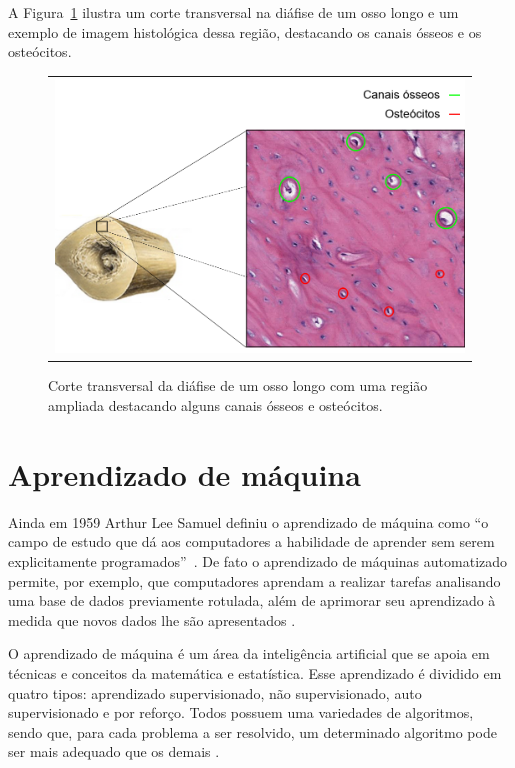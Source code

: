 A Figura~\ref{fig:corte-canais-osteocitos} ilustra um corte transversal na diáfise de um osso longo e um exemplo de imagem histológica dessa região, destacando os canais ósseos e os osteócitos.
\begin{figure}[H]
    \centering
    \center
    \begin{tabular}{@{}c@{}}
        \includegraphics[width=.8\linewidth]{figures/2_theoric_foundamentations/Corte-canais-osteocitos.png}
        \\[\abovecaptionskip]
    \end{tabular}
  
    \caption[Corte transversal da diáfise de um osso longo]{Corte transversal da diáfise de um osso longo com uma região ampliada destacando alguns canais ósseos e osteócitos.}
    \label{fig:corte-canais-osteocitos}
\end{figure}

\section{Aprendizado de máquina} \label{subsec:AutoML}
Ainda em 1959 Arthur Lee Samuel definiu o aprendizado de máquina como ``o campo de estudo que dá aos computadores a habilidade de aprender sem serem explicitamente programados''~\cite{simon2013too}. De fato o aprendizado de máquinas automatizado permite, por exemplo, que computadores aprendam a realizar tarefas analisando uma base de dados previamente rotulada, além de aprimorar seu aprendizado à medida que novos dados lhe são apresentados \cite{monard2003conceitos}.

O aprendizado de máquina é um área da inteligência artificial que se apoia em técnicas e conceitos da matemática e estatística. Esse aprendizado é dividido em quatro tipos: aprendizado supervisionado, não supervisionado, auto supervisionado e por reforço. Todos possuem uma variedades de algoritmos, sendo que, para cada problema a ser resolvido, um determinado algoritmo pode ser mais adequado que os demais \cite{mueller2019deep}.

